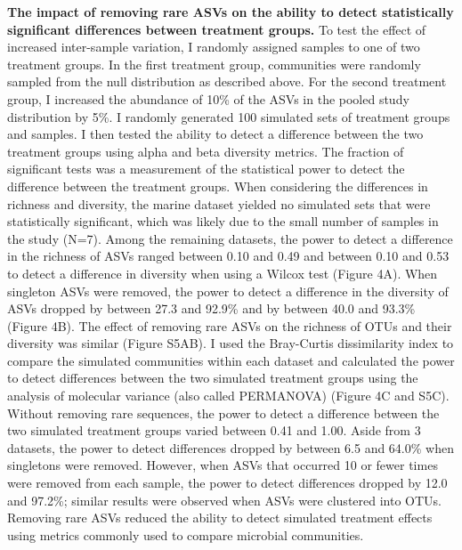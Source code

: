 \documentclass[]{article}
\begin{document}
\textbf{The impact of removing rare ASVs on the ability to detect
statistically significant differences between treatment groups.} To test
the effect of increased inter-sample variation, I randomly assigned
samples to one of two treatment groups. In the first treatment group,
communities were randomly sampled from the null distribution as
described above. For the second treatment group, I increased the
abundance of 10\% of the ASVs in the pooled study distribution by 5\%. I
randomly generated 100 simulated sets of treatment groups and samples. I
then tested the ability to detect a difference between the two treatment
groups using alpha and beta diversity metrics. The fraction of
significant tests was a measurement of the statistical power to detect
the difference between the treatment groups. When considering the
differences in richness and diversity, the marine dataset yielded no
simulated sets that were statistically significant, which was likely due
to the small number of samples in the study (N=7). Among the remaining
datasets, the power to detect a difference in the richness of ASVs
ranged between 0.10 and 0.49 and between 0.10 and 0.53 to detect a
difference in diversity when using a Wilcox test (Figure 4A). When
singleton ASVs were removed, the power to detect a difference in the
diversity of ASVs dropped by between 27.3 and 92.9\% and by between 40.0
and 93.3\% (Figure 4B). The effect of removing rare ASVs on the richness
of OTUs and their diversity was similar (Figure S5AB). I used the
Bray-Curtis dissimilarity index to compare the simulated communities
within each dataset and calculated the power to detect differences
between the two simulated treatment groups using the analysis of
molecular variance (also called PERMANOVA) (Figure 4C and S5C). Without
removing rare sequences, the power to detect a difference between the
two simulated treatment groups varied between 0.41 and 1.00. Aside from
3 datasets, the power to detect differences dropped by between 6.5 and
64.0\% when singletons were removed. However, when ASVs that occurred 10
or fewer times were removed from each sample, the power to detect
differences dropped by 12.0 and 97.2\%; similar results were observed
when ASVs were clustered into OTUs. Removing rare ASVs reduced the
ability to detect simulated treatment effects using metrics commonly
used to compare microbial communities.
\end{document}
